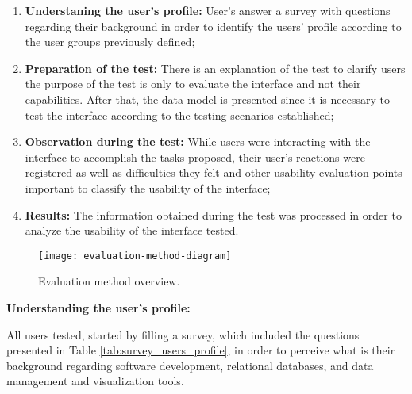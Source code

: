 \begin{enumerate}
    \item \textbf{Understaning the user's profile: } User's answer a survey with questions regarding their background in order to identify the users' profile according to the user groups previously defined;
    \item \textbf{Preparation of the test: } There is an explanation of the test to clarify users the purpose of the test is only to evaluate the interface and not their capabilities. After that, the data model is presented since it is necessary to test the interface according to the testing scenarios established;
    \item \textbf{Observation during the test: } While users were interacting with the interface to accomplish the tasks proposed, their user's reactions were registered as well as difficulties they felt and other usability evaluation points important to classify the usability of the interface;
    \item \textbf{Results: } The information obtained during the test was processed in order to analyze the usability of the interface tested.
\end{enumerate}

\begin{figure}[htbp]
	\centering
	\texttt{[image: evaluation-method-diagram]}
	\caption{Evaluation method overview.}
	\label{fig:evaluationMethodDiagram}
\end{figure}


\medskip
\textbf{Understanding the user's profile:}
\medskip

All users tested, started by filling a survey, which included the questions presented in Table \ref{tab:survey_users_profile}, in order to perceive what is their background regarding software development, relational databases, and data management and visualization tools.

